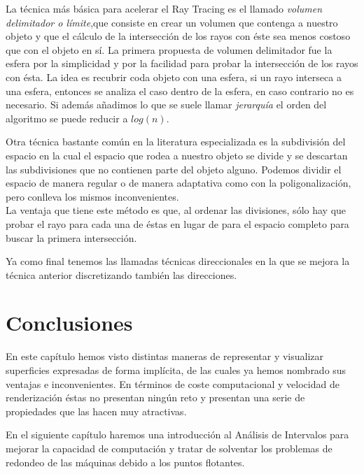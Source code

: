 La técnica más básica para acelerar el Ray Tracing es el llamado{ \em volumen delimitador o límite},que consiste en crear un volumen que contenga a nuestro objeto y que el cálculo de la intersección de los rayos con éste sea menos costoso que con el objeto en sí. La primera propuesta de volumen delimitador fue la esfera\cite{Whitted80} por la simplicidad y por la facilidad para probar la intersección de los rayos con ésta. La idea es recubrir coda objeto con una esfera, si un rayo interseca a una esfera, entonces se analiza el caso dentro de la esfera, en caso contrario no es necesario. Si además añadimos lo que se suele llamar{ \em jerarquía} el orden del algoritmo se puede reducir a $log(n)$.
\par Otra técnica bastante común en la literatura especializada es la subdivisión del espacio en la cual el espacio que rodea a nuestro objeto se divide y se descartan las subdivisiones que no contienen parte del objeto alguno. Podemos dividir el espacio de manera regular o de manera adaptativa como con la poligonalización, pero conlleva los mismos inconvenientes.\\ La ventaja que  tiene este método es que, al ordenar las divisiones, sólo hay que probar el rayo para cada una de éstas en lugar de para el espacio completo para buscar la primera intersección.
\par Ya como final tenemos las llamadas técnicas direccionales en la que se mejora la técnica anterior discretizando también las direcciones.

\section{Conclusiones}

En este capítulo hemos visto distintas maneras de representar y visualizar superficies expresadas de forma implícita, de las cuales ya hemos nombrado sus ventajas e inconvenientes. En términos de coste computacional y velocidad de renderización éstas no presentan ningún reto y presentan una serie de propiedades que las hacen muy atractivas.
\par En el siguiente capítulo haremos una introducción al Análisis de Intervalos para mejorar la capacidad de computación y tratar de solventar los problemas de redondeo de las máquinas debido a los puntos flotantes.